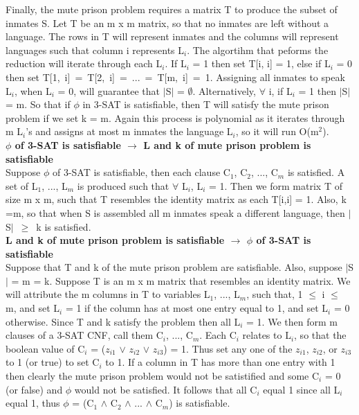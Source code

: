 \documentclass[10pt]{csc_assignment}
\begin{document}
\begin{description}
Finally, the mute prison problem requires a matrix T to produce the subset of inmates S. Let T be an m x m matrix, so that no inmates are left without a language. The rows in T will represent inmates and the columns will represent languages such that column i represents L$_{i}$. The algortihm that peforms the reduction will iterate through each L$_{i}$. If L$_{i}$ = 1 then set T[i, i] = 1, else if L$_{i}$ =  0 then set \mbox{T[1, i] = T[2, i] = ... = T[m, i] = 1}. Assigning all inmates to speak L$_{i}$, when L$_{i}$ = 0, will guarantee that $\mid$S$\mid$ = $\emptyset$. Alternatively, $\forall$ i, if L$_{i}$ = 1 then $\mid$S$\mid$ = m. So that if $\phi$ in 3-SAT is satisfiable, then T will satisfy the mute prison problem if we set k = m. Again this process is polynomial as it iterates through m L$_{i}$'s and assigns at most m inmates the language L$_{i}$, so it will run O(m$^{2}$).\\
\textbf{$\phi$ of 3-SAT is satisfiable $\rightarrow$ L and k of mute prison problem is satisfiable}\\
Suppose $\phi$ of 3-SAT is satisfiable, then each clause C$_{1}$, C$_{2}$, ..., C$_{m}$ is satisfied. A set of L$_{1}$, ..., L$_{m}$ is produced such that $\forall$ L$_{i}$, L$_{i}$ = 1. Then we form matrix T of size m x m, such that T resembles the identity matrix as each T[i,i] = 1. Also, k =m, so that when S is assembled all m inmates speak a different language, then \mbox{$\mid$S$\mid$ $\geqslant$ k} is satisfied.\\ 
\textbf{L and k of mute prison problem is satisfiable $\rightarrow$ $\phi$ of 3-SAT is satisfiable}\\
Suppose that T and k of the mute prison problem are satisfiable. Also, suppose $\mid$S$\mid$ = m = k. Suppose T is an m x m matrix that resembles an identity matrix. We will attribute the m columns in T to variables L$_{1}$, ..., L$_{m}$, such that, 1 $\leqslant$ i $\leqslant$ m, and set L$_{i}$ = 1 if the column has at most one entry equal to 1, and set L$_{i}$ = 0 otherwise. Since T and k satisfy the problem then all L$_{i}$ = 1. We then form m clauses of a 3-SAT CNF, call them C$_{i}$, ..., C$_{m}$. Each C$_{i}$ relates to L$_{i}$, so that the boolean value of C$_{i}$ = ($z_{i1}$ $\lor$ $z_{i2}$ $\lor$ $z_{i3}$) = 1. Thus set any one of the $z_{i1}$, $z_{i2}$, or $z_{i3}$ to 1 (or true) to set C$_{i}$ to 1. If a column in T has more than one entry with 1 then clearly the mute prison problem would not be satistified and some C$_{i}$ = 0 (or false) and $\phi$ would not be satisfied. It follows that all C$_{i}$ equal 1 since all L$_{i}$ equal 1, thus $\phi$ = (C$_{1}$ $\land$ C$_{2}$ $\land$ ... $\land$ C$_{m}$) is satisfiable.\\


\end{description}
\end{document}
